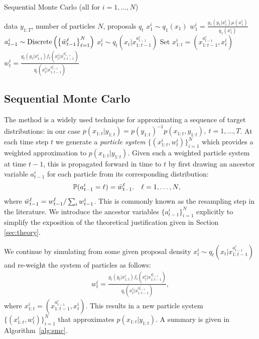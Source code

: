 %
%

\begin{algorithm}[tb]
	\caption{Sequential Monte Carlo \hfill {\small (all for $i=1,\ldots,N$)}}
	\label{alg:smc}
	\begin{spacing}{1.2}
	\begin{algorithmic}[1]
		 data $y_{1:T}$, number of particles $N$, proposals $q_t$
		\STATE $x_1^i \sim q_1(x_1)$
		\STATE $w_1^i = \frac{g_1(y_1|x_1^i) \mu(x_1^i)}{q_1(x_1^i)}$
		\STATE $a_{t-1}^i \sim \operatorname*{Discrete}\left(\left\{\bar w_{t-1}^{\ell}\right\}_{\ell=1}^N\right)$%
		\STATE $x_t^i \sim q_t(x_t | x_{1:t-1}^{a_{t-1}^i})$ 
		\STATE Set $x_{1:t}^i = (x_{1:t-1}^{a_{t-1}^i},x_t^i)$
		\STATE $w_t^i = \frac{g_t(y_t|x_{1:t}^i) f_t(x_t^i | x_{1:t-1}^{a_{t-1}^i})}{q_t(x_t^i|x_{1:t-1}^{a_{t-1}^i})}$
		\ENDFOR
	\end{algorithmic}
\end{spacing}
\end{algorithm}

\subsection{Sequential Monte Carlo}
\label{sec:ipmcmc:background:smc}
The \smc method is a widely used technique for approximating a sequence of target distributions: in our case $p(x_{1:t}|y_{1:t}) = p(y_{1:t})^{-1} p(x_{1:t},y_{1:t}), ~t=1,\ldots,T$. 
At each time step $t$ we 
generate a \emph{particle system}
$\{(x_{1:t}^i,w_{t}^i)\}_{i=1}^N$ which provides a weighted approximation  to $p(x_{1:t}|y_{1:t})$. Given such a weighted particle system at time $t-1$, this 
is propagated forward in time to $t$ by first drawing an ancestor variable $a_{t-1}^i$ for each particle from its corresponding distribution:
\begin{align}
\mathbb{P}(a_{t-1}^i = \ell) &= \bar w_{t-1}^\ell.
&
\ell&=1,\ldots,N,
\end{align}
where $\bar w_{t-1}^\ell = w_{t-1}^\ell / \sum_i w_{t-1}^i$. This is commonly known as the resampling step in the literature. We introduce the ancestor variables $\{a_{t-1}^i\}_{i=1}^N$ explicitly to simplify the exposition of the theoretical justification given in Section \ref{sec:theory}.

We continue by simulating from some given proposal density $x_t^i \sim q_t(x_t | x_{1:t-1}^{a_{t-1}^i})$ and re-weight the system of particles as follows:
\begin{align}
\label{eq:smcweights}
w_t^i = \frac{g_t(y_t|x_{1:t}^i) f_t(x_t^i | x_{1:t-1}^{a_{t-1}^i})}{q_t(x_t^i|x_{1:t-1}^{a_{t-1}^i})},
\end{align}
where $x_{1:t}^i = (x_{1:t-1}^{a_{t-1}^i},x_t^i)$. This results in a new particle system $\{(x_{1:t}^i,w_t^i)\}_{i=1}^N$ that approximates $p(x_{1:t}|y_{1:t})$. A summary is given in Algorithm~\ref{alg:smc}.

